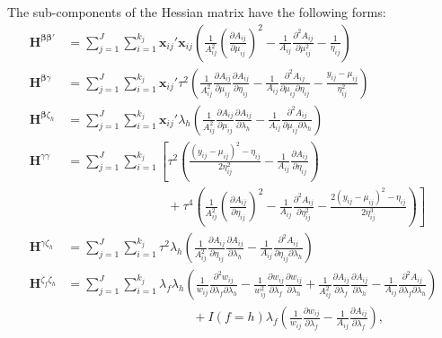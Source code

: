 \documentclass[
  american,
  man, donotrepeattitle,floatsintext]{apa7}
\begin{document}
The sub-components of the Hessian matrix have the following forms:
\begin{align}
\mathbf{H}^{\boldsymbol\beta \boldsymbol\beta'} &= \sum_{j=1}^{J} \sum_{i=1}^{k_j}  \mathbf{x}_{ij}' \mathbf{x}_{ij} \left(\frac{1}{A_{ij}^2}\left(\frac{\partial A_{ij}}{\partial \mu_{ij}}\right)^2 - \frac{1}{A_{ij}} \frac{\partial^2 A_{ij}}{\partial \mu_{ij}^2} - \frac{1}{\eta_{ij}} \right) \\
\mathbf{H}^{\boldsymbol\beta \gamma} &= \sum_{j=1}^{J} \sum_{i=1}^{k_j}  \mathbf{x}_{ij}' \tau^2 \left(\frac{1}{A_{ij}^2} \frac{\partial A_{ij}}{\partial \mu_{ij}}\frac{\partial A_{ij}}{\partial \eta_{ij}} - \frac{1}{A_{ij}}\frac{\partial^2 A_{ij}}{\partial \mu_{ij} \partial \eta_{ij}} - \frac{y_{ij} - \mu_{ij}}{\eta_{ij}^2} \right) \\
\mathbf{H}^{\boldsymbol\beta \zeta_h} &= \sum_{j=1}^{J} \sum_{i=1}^{k_j} \mathbf{x}_{ij}' \lambda_h \left(\frac{1}{A_{ij}^2} \frac{\partial A_{ij}}{\partial \mu_{ij}}\frac{\partial A_{ij}}{\partial \lambda_h} - \frac{1}{A_{ij}}\frac{\partial^2 A_{ij}}{\partial \mu_{ij} \partial \lambda_h} \right) \\
\mathbf{H}^{\gamma \gamma} &= \sum_{j=1}^{J} \sum_{i=1}^{k_j} \left[ \tau^2 \left(\frac{\left(y_{ij} - \mu_{ij}\right)^2 - \eta_{ij}}{2\eta_{ij}^2} - \frac{1}{A_{ij}}\frac{\partial A_{ij}}{\partial \eta_{ij}}\right) \right.  \nonumber \\
& \qquad \qquad \qquad \qquad  + \left. \tau^4 \left(\frac{1}{A_{ij}^2} \left(\frac{\partial A_{ij}}{\partial \eta_{ij}}\right)^2 - \frac{1}{A_{ij}}\frac{\partial^2 A_{ij}}{\partial \eta_{ij}^2}  - \frac{2(y_{ij} - \mu_{ij})^2 - \eta_{ij}}{2\eta_{ij}^3}\right)\right] \\
\mathbf{H}^{\gamma \zeta_h} &= \sum_{j=1}^{J} \sum_{i=1}^{k_j} \tau^2 \lambda_h \left(\frac{1}{A_{ij}^2} \frac{\partial A_{ij}}{\partial \eta_{ij}}\frac{\partial A_{ij}}{\partial \lambda_h} - \frac{1}{A_{ij}}\frac{\partial^2 A_{ij}}{\partial \eta_{ij} \partial \lambda_h} \right) \\
\mathbf{H}^{\zeta_f \zeta_h} &= \sum_{j=1}^{J} \sum_{i=1}^{k_j}  \lambda_f \lambda_h \left(\frac{1}{w_{ij}}\frac{\partial^2 w_{ij}}{\partial \lambda_{f} \partial \lambda_{h}} - \frac{1}{w_{ij}^2}\frac{\partial w_{ij}}{\partial \lambda_{f}}\frac{\partial w_{ij}}{\partial \lambda_{h}} + \frac{1}{A_{ij}^2} \frac{\partial A_{ij}}{\partial \lambda_{f}}\frac{\partial A_{ij}}{\partial \lambda_{h}} - \frac{1}{A_{ij}}\frac{\partial^2 A_{ij}}{\partial \lambda_{f} \partial \lambda_{h}} \right) \nonumber \\
& \qquad \qquad \qquad \qquad \qquad  + I(f = h) \lambda_f \left(\frac{1}{w_{ij}}\frac{\partial w_{ij}}{\partial \lambda_{f}} - \frac{1}{A_{ij}}\frac{\partial A_{ij}}{\partial \lambda_{f}}\right), \label{eq:H-zeta-zeta}
\end{align}
\end{document}
